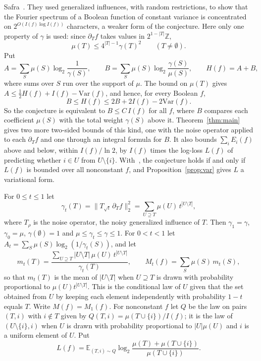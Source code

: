 \documentclass[11pt]{amsart}
\theoremstyle{remark}
\newcommand{\Var}{\mathrm{Var}}
\newcommand{\E}{\mathbb{E}}
\begin{document}
Safra~\cite{KKLMS}. They used generalized influences, with random restrictions, to show that the Fourier spectrum of
a Boolean function of constant variance is concentrated on $2^{O(I(f)\log I(f))}$ characters, a weaker form of the
conjecture. Here only one property of $\gamma$ is used: since $\partial_Tf$ takes values in $2^{1-|T|}\mathbb Z$,
\[
\mu(T)\le 4^{|T|-1}\gamma(T)^2\qquad(T\ne\emptyset).
\]
Put
\[
A=\sum_S\mu(S)\log_2\frac1{\gamma(S)},\qquad B=\sum_S\mu(S)\log_2\frac{\gamma(S)}{\mu(S)},\qquad H(f)=A+B,
\]
where sums over $S$ run over the support of $\mu$. The bound on $\mu(T)$ gives $A\le\frac12H(f)+I(f)-\Var(f)$, and
hence, for every Boolean $f$,
\[
B\le H(f)\le 2B+2I(f)-2\Var(f).
\]
So the conjecture is equivalent to $B\le C\,I(f)$ for all $f$, where $B$ compares each coefficient $\mu(S)$ with the
total weight $\gamma(S)$ above it. Theorem~\ref{thm:main} gives two more two-sided bounds of this kind, one with the
noise operator applied to each $\partial_Tf$ and one through an integral formula for $B$. It also bounds
$\sum_iE_i(f)$ above and below, within $I(f)/\ln2$, by $I(f)$ times the log-loss $L(f)$ of predicting whether $i\in U$
from $U\setminus\{i\}$. With~\cite[Corollary~5]{Shm1}, the conjecture holds if and only if $L(f)$ is bounded over all
nonconstant $f$, and Proposition~\ref{prop:var} gives $L$ a variational form.

For $0\le t\le1$ let
\[
\gamma_t(T)=\|T_{\sqrt t}\,\partial_T f\|_2^2=\sum_{U\supseteq T}\mu(U)\,t^{|U\setminus T|},
\]
where $T_\rho$ is the noise operator, the noisy generalized influence of $T$. Then $\gamma_1=\gamma$, $\gamma_0=\mu$,
$\gamma(\emptyset)=1$ and $\mu\le\gamma_t\le\gamma\le 1$. For $0<t<1$ let $A_t=\sum_S\mu(S)\log_2(1/\gamma_t(S))$, and
let
\[
m_t(T)=\frac{\sum_{U\supseteq T}|U\setminus T|\,\mu(U)\,t^{|U\setminus T|}}{\gamma_t(T)},\qquad
M_t(f)=\sum_S\mu(S)\,m_t(S),
\]
so that $m_t(T)$ is the mean of $|U\setminus T|$ when $U\supseteq T$ is drawn with probability proportional to
$\mu(U)t^{|U\setminus T|}$. This is the conditional law of $U$ given that the set obtained from $U$ by keeping each
element independently with probability $1-t$ equals $T$. Write $M(f)=M_1(f)$. For nonconstant $f$ let $Q$ be the law
on pairs $(T,i)$ with $i\notin T$ given by $Q(T,i)=\mu(T\cup\{i\})/I(f)$; it is the law of $(U\setminus\{i\},i)$ when
$U$ is drawn with probability proportional to $|U|\mu(U)$ and $i$ is a uniform element of $U$. Put
\[
L(f)=\E_{(T,i)\sim Q}\log_2\frac{\mu(T)+\mu(T\cup\{i\})}{\mu(T\cup\{i\})}.
\]
\end{document}
